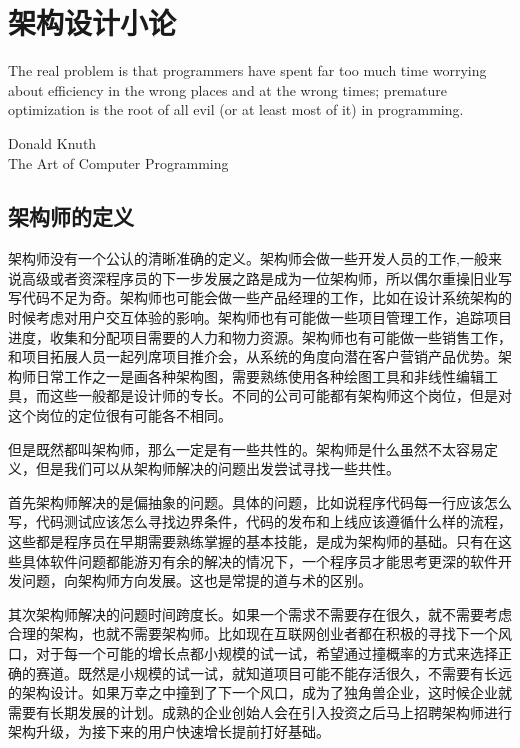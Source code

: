 \chapter{架构设计小论}

\epigraph{The real problem is that programmers have spent far too much time worrying about efficiency in the wrong places and at the wrong times; premature optimization is the root of all evil (or at least most of it) in programming.}{Donald Knuth \\ The Art of Computer Programming}

\section{架构师的定义}

架构师没有一个公认的清晰准确的定义。架构师会做一些开发人员的工作,一般来说高级或者资深程序员的下一步发展之路是成为一位架构师，所以偶尔重操旧业写写代码不足为奇。架构师也可能会做一些产品经理的工作，比如在设计系统架构的时候考虑对用户交互体验的影响。架构师也有可能做一些项目管理工作，追踪项目进度，收集和分配项目需要的人力和物力资源。架构师也有可能做一些销售工作，和项目拓展人员一起列席项目推介会，从系统的角度向潜在客户营销产品优势。架构师日常工作之一是画各种架构图，需要熟练使用各种绘图工具和非线性编辑工具，而这些一般都是设计师的专长。不同的公司可能都有架构师这个岗位，但是对这个岗位的定位很有可能各不相同。



但是既然都叫架构师，那么一定是有一些共性的。架构师是什么虽然不太容易定义，但是我们可以从架构师解决的问题出发尝试寻找一些共性。



首先架构师解决的是偏抽象的问题。具体的问题，比如说程序代码每一行应该怎么写，代码测试应该怎么寻找边界条件，代码的发布和上线应该遵循什么样的流程，这些都是程序员在早期需要熟练掌握的基本技能，是成为架构师的基础。只有在这些具体软件问题都能游刃有余的解决的情况下，一个程序员才能思考更深的软件开发问题，向架构师方向发展。这也是常提的道与术的区别。



其次架构师解决的问题时间跨度长。如果一个需求不需要存在很久，就不需要考虑合理的架构，也就不需要架构师。比如现在互联网创业者都在积极的寻找下一个风口，对于每一个可能的增长点都小规模的试一试，希望通过撞概率的方式来选择正确的赛道。既然是小规模的试一试，就知道项目可能不能存活很久，不需要有长远的架构设计。如果万幸之中撞到了下一个风口，成为了独角兽企业，这时候企业就需要有长期发展的计划。成熟的企业创始人会在引入投资之后马上招聘架构师进行架构升级，为接下来的用户快速增长提前打好基础。



